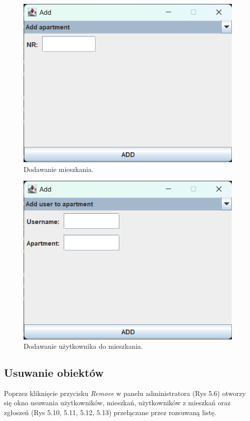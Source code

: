 \begin{figure}[H]
    \centering
    \includegraphics[width=\textwidth,height=0.2\textheight,keepaspectratio]{figures/app-images/Add/add-apartment.png}
    \caption{Dodawanie mieszkania.\label{fig13}}
\end{figure}

\begin{figure}[H]
    \centering
    \includegraphics[width=\textwidth,height=0.2\textheight,keepaspectratio]{figures/app-images/Add/add-user-to-apartment.png}
    \caption{Dodawanie użytkownika do mieszkania.\label{fig14}}
\end{figure}

\newpage
\subsection{Usuwanie obiektów}
Poprzez kliknięcie przycisku \textit{Remove} w panelu administratora (Rys 5.6) otworzy się okno usuwania użytkowników, mieszkań, 
użytkowników z mieszkań oraz zgłoszeń (Rys 5.10, 5.11, 5.12, 5.13) przełączane przez rozsuwaną listę.

